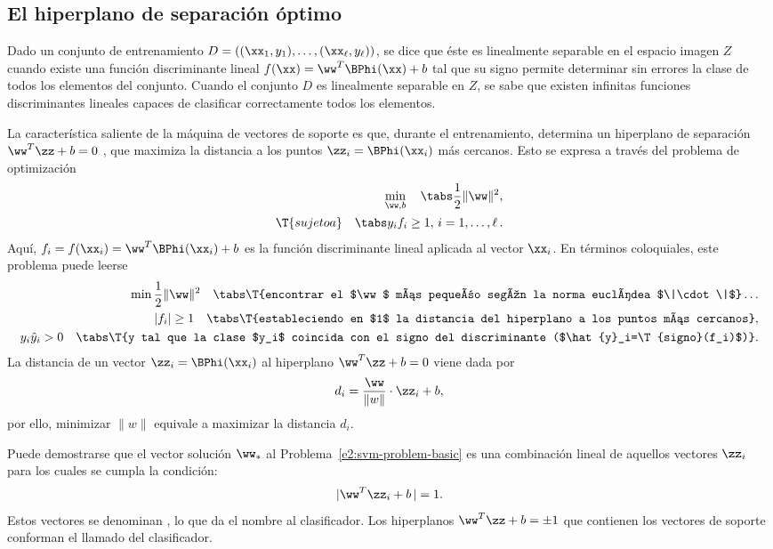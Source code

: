 %
%
\subsection{El hiperplano de separación óptimo}
%
Dado un conjunto de entrenamiento
$D=\left((\xx_1,y_1),\ldots,(\xx_\ell,y_\ell)\right)$, se dice que
éste es linealmente separable en el espacio imagen $Z$ cuando existe
una función discriminante lineal $f(\xx)=\ww^T\BPhi(\xx)+b$ tal que su
signo permite determinar sin errores la clase de todos los elementos
del conjunto. Cuando el conjunto $D$ es linealmente separable en $Z$,
se sabe que existen infinitas funciones discriminantes lineales
capaces de clasificar correctamente todos los elementos.

La característica saliente de la máquina de vectores de soporte es
que, durante el entrenamiento, determina un hiperplano de separación
$\ww^T\zz+b=0$ , que maximiza la distancia a los puntos
$\zz_i=\BPhi(\xx_i)$ más cercanos. Esto se expresa a través del
problema de optimización
%
\begin{equation}\label{e2:svm-problem-basic}
  \begin{aligned}
    \min_{\ww,b} \quad\tabs \frac{1}{2}\|\ww\|^2, \\
    \T{sujeto a}\quad\tabs y_i f_i\geq1,\,i=1,\ldots,\ell\,.
  \end{aligned}
\end{equation}
%
Aquí, $f_i=f(\xx_i)=\ww^T\BPhi(\xx_i)+b$ es la función discriminante
lineal aplicada al vector $\xx_i$. En términos coloquiales, este
problema puede leerse
%
\begin{align*}
  \min \frac{1}{2}\|\ww\|^2 \quad \tabs \T{encontrar el $\ww$ más
    pequeño según la norma euclídea $\|\cdot\|$}\ldots\\
  |f_i|\geq1 \quad \tabs \T{estableciendo en $1$ la distancia del
    hiperplano a los puntos más cercanos},\\
  y_i\hat{y}_i>0\quad \tabs \T{y tal que la clase $y_i$ coincida con el
    signo del discriminante ($\hat{y}_i=\T{signo}(f_i)$)}.
\end{align*}
%
La distancia de un vector $\zz_i=\BPhi(\xx_i)$ al hiperplano
$\ww^T\zz+b=0$ viene dada por
%
\begin{align*}
  d_i=\frac{\ww}{\|w\|}\cdot\zz_i+b,
\end{align*}
%
por
ello, minimizar $\|w\|$ equivale a maximizar la distancia $d_i$.

Puede demostrarse que el vector solución $\ww_*$ al
Problema~\ref{e2:svm-problem-basic} es una combinación lineal de
aquellos vectores $\zz_i$ para los cuales se cumpla la condición:
%
\begin{align*}
  |\ww^T\zz_i+b\,|=1.
\end{align*}
%
Estos vectores se denominan , lo que da el
nombre al clasificador.
Los hiperplanos $\ww^T\zz+b=\pm1$ que contienen los vectores
de soporte conforman el llamado  del clasificador.

